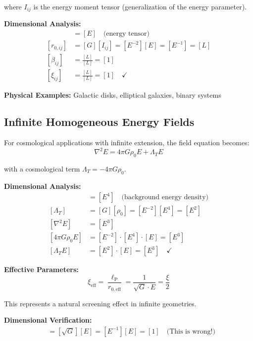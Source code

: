 \documentclass[12pt,a4paper]{report}
\newcommand{\lP}{\ell_{\text{P}}}         %
\newcommand{\Lambdat}{\Lambda_T}          %
\begin{document}
	where $I_{ij}$ is the energy moment tensor (generalization of the energy parameter).
	
	\textbf{Dimensional Analysis:}
	\begin{align}
		[I_{ij}] &= [E] \quad \text{(energy tensor)} \\
		[r_{0,ij}] &= [G][I_{ij}] = [E^{-2}][E] = [E^{-1}] = [L] \\
		[\beta_{ij}] &= \frac{[L]}{[L]} = [1] \\
		[\xi_{ij}] &= \frac{[L]}{[L]} = [1] \quad \checkmark
	\end{align}
	
	\textbf{Physical Examples:} Galactic disks, elliptical galaxies, binary systems
	
	\subsection{Infinite Homogeneous Energy Fields}\label{subsec:infinite_homogeneous}
	
	For cosmological applications with infinite extension, the field equation becomes:
	\begin{equation}
		\nabla^2 E = 4\pi G \rho_0 E + \Lambdat E
	\end{equation}
	
	with a cosmological term $\Lambdat = -4\pi G \rho_0$.
	
	\textbf{Dimensional Analysis:}
	\begin{align}
		[\rho_0] &= [E^4] \quad \text{(background energy density)} \\
		[\Lambdat] &= [G][\rho_0] = [E^{-2}][E^4] = [E^2] \\
		[\nabla^2 E] &= [E^3] \\
		[4\pi G \rho_0 E] &= [E^{-2}] \cdot [E^4] \cdot [E] = [E^3] \\
		[\Lambdat E] &= [E^2] \cdot [E] = [E^3] \quad \checkmark
	\end{align}
	
	\textbf{Effective Parameters:}
	\begin{equation}
		\xi_{\text{eff}} = \frac{\lP}{r_{0,\text{eff}}} = \frac{1}{\sqrt{G} \cdot E} = \frac{\xi}{2}
	\end{equation}
	
	This represents a natural screening effect in infinite geometries.
	
	\textbf{Dimensional Verification:}
	\begin{align}
		[r_{0,\text{eff}}] &= [\sqrt{G}][E] = [E^{-1}][E] = [1] \quad \text{(This is wrong!)}
	\end{align}
	
\end{document}
